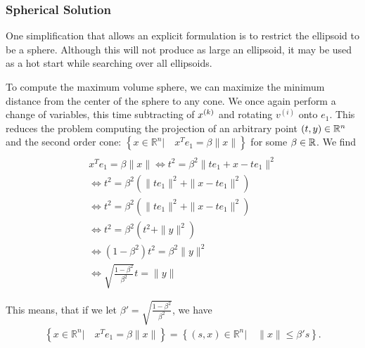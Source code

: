 %             
% 


\subsubsection{Spherical Solution}

One simplification that allows an explicit formulation is to restrict the ellipsoid to be a sphere.
Although this will not produce as large an ellipsoid, it may be used as a hot start while searching over all ellipsoids.

To compute the maximum volume sphere, we can maximize the minimum distance from the center of the sphere to any cone.
We once again perform a change of variables, this time subtracting of $x^{(k)}$ and rotating $v^{(i)}$ onto $e_1$.
This reduces the problem computing the projection of an arbitrary point $(t, y) \in \mathbb R^n$ and the second order cone: $\left\{ x \in \mathbb R^n | \quad x^Te_1 = \beta \|x\| \right\}$ for some $\beta \in \mathbb R$.
We find
\begin{align*}
 \\
x^Te_1 = \beta \|x\| 
 \Longleftrightarrow t^2 = \beta^2 \|te_1  + x - t e_1\|^2 \\
 \Longleftrightarrow t^2 = \beta^2 \left(\|te_1\|^2  + \|x - t e_1\|^2\right) \\
 \Longleftrightarrow t^2 = \beta^2 \left(\|te_1\|^2  + \|x - t e_1\|^2\right) \\
 \Longleftrightarrow t^2 = \beta^2 \left(t^2  + \|y\|^2 \right) \\
 \Longleftrightarrow (1 - \beta^2)t^2 = \beta^2 \|y\|^2 \\
 \Longleftrightarrow \sqrt{\frac{1 - \beta^2}{ \beta^2}} t = \|y\|
\end{align*}

This means, that if we let $\beta' = \sqrt{\frac{1 - \beta^2}{\beta^2}}$, we have
\begin{align*}
\left\{ x \in \mathbb R^n | \quad x^Te_1 = \beta \|x\| \right\} = \left \{(s, x)\in \mathbb R^n | \quad\|x\| \le \beta' s \right\}.
\end{align*}

